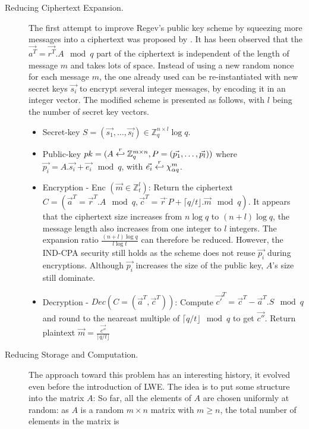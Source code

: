 \begin{description}
\item[Reducing Ciphertext Expansion.] The first attempt to improve Regev's public key scheme by squeezing more messages into a ciphertext was proposed by
  \cite{peikert2008framework} .  It has been observed that the
  $\vec{a^T} = \vec{r^T}. A \mod q$ part of the ciphertext is independent of the length of
  message $m$ and takes lots of space. Instead of using a new random nonce for
  each message $m$, the one already used can be re-instantiated with new secret keys
  $\vec{s_i}$ to encrypt several integer messages, by encoding it in an integer
  vector. The modified scheme is presented as follows, with $l$ being the number
  of secret key vectors.
  \begin{itemize}
  \item Secret-key
    $S = (\vec{s_1}, \dots, \vec{s_l}) \in \mathbb{Z}_q^{n \times l} \log q$.
  \item Public-key
    $pk = (A \stackrel{r}{\hookleftarrow} \mathbb{Z}_q^{m \times n},P=(\vec{p_1}, \dots,
    \vec{p_l}))$ where $\vec{p_i} = A.\vec{s_i} + \vec{e_i} \mod q$, with
    $\vec{e_i} \stackrel{r}{\hookleftarrow} \chi_{\alpha q}^m$.
  \item Encryption - Enc $(\vec{m} \in \mathbb{Z}_t^l)$: Return the ciphertext
    $C = (\vec{a}^T= \vec{r}^T.A \mod q, \vec{c}^T = \vec{r}^.P + \lceil q/t
    \rfloor . \vec{m} \mod q)$. It appears that the ciphertext size increases from
    $n\log q$ to $(n+l)\log q$, the message length also increases from one
    integer to $l$ integers. The expansion ratio $\frac{(n+l)\log q}{l \log t}$
    can therefore be reduced. However, the IND-CPA security still holds as the scheme
    does not reuse $\vec{p_i}$ during encryptions. Although $\vec{p_i}$ increases the size of
    the public key, $A$'s size still dominate.
  \item Decryption - $Dec(C = (\vec{a}^T, \vec{c}^T))$: Compute
    $\vec{c'}^T = \vec{c}^T - \vec{a}^T.S \mod q$ and round to the neareast
    multiple of $\lceil q/t \rfloor \mod q$ to get $\vec{c''}$. Return plaintext
    $\vec{m} = \frac{\vec{c''}}{\lceil q/t \rfloor}$
  \end{itemize}
\item [Reducing Storage and Computation.] The approach toward this problem has
  an interesting history, it evolved even before the introduction of LWE. The
  idea is to put some structure into the matrix $A$: So far, all the elements of
  $A$ are chosen uniformly at random: as $A$ is a random $m \times n$
  matrix with $m \geq n$, the total number of elements in the matrix is

\end{description}
